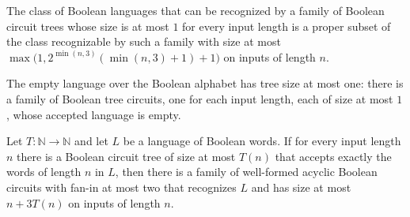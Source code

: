 \begin{theorem}
\label{BoolCircuit.treeSize_one_ssubset}
\leanok
{}
The class of Boolean languages that can be recognized by a family of Boolean circuit
trees whose size is at most $1$ for every input length is a proper subset of the class
recognizable by such a family with size at most
$\max\bigl(1,2^{\min(n,3)}(\min(n,3)+1)+1\bigr)$ on inputs of length $n$.
\end{theorem}

\begin{theorem}
\label{BoolCircuit.zero_mem_treeSize_one}
\leanok
{}
The empty language over the Boolean alphabet has tree size at most one: there is a
family of Boolean tree circuits, one for each input length, each of size at most $1$,
whose accepted language is empty.
\end{theorem}

\begin{theorem}
\label{Language.InTreeSize.inSIZE}
\leanok
{}
Let $T:\mathbb{N}\to\mathbb{N}$ and let $L$ be a language of Boolean words. If for every
input length $n$ there is a Boolean circuit tree of size at most $T(n)$ that accepts
exactly the words of length $n$ in $L$, then there is a family of well-formed acyclic
Boolean circuits with fan-in at most two that recognizes $L$ and has size at most
$n+3T(n)$ on inputs of length $n$.
\end{theorem}
